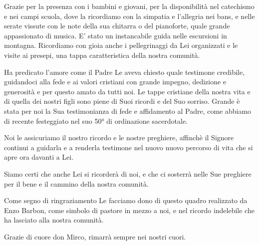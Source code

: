 Grazie per la presenza con i bambini e giovani, per la disponibilità nel catechismo e nei campi scuola, dove la ricordiamo con la simpatia e l’allegria nei bans, e nelle serate vissute con le note della sua chitarra o del pianoforte, quale grande appassionato di musica. E’ stato un instancabile guida nelle escursioni in montagna. Ricordiamo con gioia anche i pellegrinaggi da Lei organizzati e le visite ai presepi, una tappa caratteristica della nostra comunità.

Ha predicato l’amore come il Padre Le aveva chiesto quale testimone credibile, guidandoci alla fede e ai valori cristiani con grande impegno, dedizione e generosità e per questo amato da tutti noi. Le tappe cristiane della nostra vita e di quella dei nostri figli sono piene di Suoi ricordi e del Suo sorriso. Grande è stata per noi la Sua testimonianza di fede e affidamento al Padre, come abbiamo di recente festeggiato nel suo 50° di ordinazione sacerdotale.

Noi le assicuriamo il nostro ricordo e le nostre preghiere, affinchè il Signore continui a guidarla e a renderla testimone nel nuovo nuovo percorso di vita che si apre ora davanti a Lei.

Siamo certi che anche Lei si ricorderà di noi, e che ci sosterrà nelle Sue preghiere per il bene e il cammino della nostra comunità.

Come segno di ringraziamento Le facciamo dono di questo quadro realizzato da Enzo Barbon, come simbolo di pastore in mezzo a noi, e nel ricordo indelebile che ha lasciato alla nostra comunità. 


Grazie di cuore don Mirco, rimarrà sempre nei nostri cuori.

